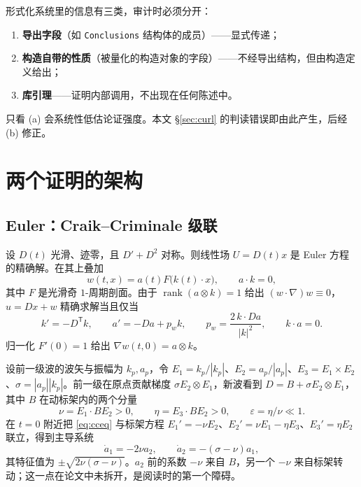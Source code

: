 \documentclass[11pt,a4paper]{ctexart}
\theoremstyle{definition}
\newcommand{\eps}{\varepsilon}
\newcommand{\abs}[1]{\left\lvert #1\right\rvert}
\begin{document}
形式化系统里的信息有三类，审计时必须分开：
\begin{enumerate}[label=(\alph*)]
\item \textbf{导出字段}（如 \texttt{Conclusions} 结构体的成员）——显式传递；
\item \textbf{构造自带的性质}（被量化的构造对象的字段）——不经导出结构，但由构造定义给出；
\item \textbf{库引理}——证明内部调用，不出现在任何陈述中。
\end{enumerate}
只看 (a) 会系统性低估论证强度。本文 \S\ref{sec:curl} 的判读错误即由此产生，后经 (b) 修正。

\section{两个证明的架构}

\subsection{Euler：Craik--Criminale 级联}

设 $D(t)$ 光滑、迹零，且 $D'+D^2$ 对称。则线性场 $U=D(t)x$ 是 Euler 方程的精确解。在其上叠加
\begin{equation}\label{eq:cc}
w(t,x)=a(t)F\bigl(k(t)\cdot x\bigr),\qquad a\cdot k=0,
\end{equation}
其中 $F$ 是光滑奇 $1$-周期剖面。由于 $\operatorname{rank}(a\otimes k)=1$ 给出 $(w\cdot\nabla)w\equiv0$，$u=Dx+w$ 精确求解当且仅当
\begin{equation}\label{eq:cceq}
k'=-D^{\mathsf T}k,\qquad a'=-Da+p_wk,\qquad p_w=\frac{2\,k\cdot Da}{\abs{k}^2},\qquad k\cdot a=0 .
\end{equation}
归一化 $F'(0)=1$ 给出 $\nabla w(t,0)=a\otimes k$。

设前一级波的波矢与振幅为 $k_p,a_p$，令 $E_1=k_p/\abs{k_p}$、$E_2=a_p/\abs{a_p}$、$E_3=E_1\times E_2$、$\sigma=\abs{a_p}\abs{k_p}$。前一级在原点贡献梯度 $\sigma E_2\otimes E_1$，新波看到 $D=B+\sigma E_2\otimes E_1$，其中 $B$ 在动标架内的两个分量
\begin{equation}
\nu=E_1\cdot BE_2>0,\qquad \eta=E_3\cdot BE_2>0,\qquad \eps=\eta/\nu\ll1 .
\end{equation}
在 $t=0$ 附近把 \eqref{eq:cceq} 与标架方程 $E_1'=-\nu E_2$、$E_2'=\nu E_1-\eta E_3$、$E_3'=\eta E_2$ 联立，得到主导系统
\begin{equation}\label{eq:lin}
\dot a_1=-2\nu a_2,\qquad \dot a_2=-(\sigma-\nu)a_1 ,
\end{equation}
其特征值为 $\pm\sqrt{2\nu(\sigma-\nu)}$。$a_2$ 前的系数 $-\nu$ 来自 $B$，另一个 $-\nu$ 来自标架转动；这一点在论文中未拆开，是阅读时的第一个障碍。
\end{document}
